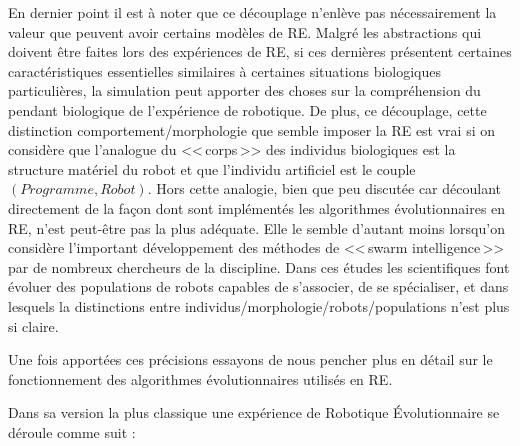 En dernier point il est à noter que ce découplage n'enlève pas nécessairement la valeur que peuvent avoir certains modèles de RE. Malgré les abstractions qui doivent être faites lors des expériences de RE, si ces dernières présentent certaines caractéristiques essentielles similaires à certaines situations biologiques particulières, la simulation peut apporter des choses sur la compréhension du pendant biologique de l'expérience de robotique. De plus, ce découplage, cette distinction comportement/morphologie que semble imposer la RE est vrai si on considère que l'analogue du <<\,corps\,>> des individus biologiques est la structure matériel du robot et que l'individu artificiel est le couple $(Programme,Robot)$. Hors cette analogie, bien que peu discutée car découlant directement de la façon dont sont implémentés les algorithmes évolutionnaires en RE, n'est peut-être pas la plus adéquate. Elle le semble d'autant moins lorsqu'on considère l'important développement des méthodes de <<\,swarm intelligence\,>> par de nombreux chercheurs de la discipline. Dans ces études les scientifiques font évoluer des populations de robots capables de s'associer, de se spécialiser, et dans lesquels la distinctions entre individus/morphologie/robots/populations n'est plus si claire.

Une fois apportées ces précisions essayons de nous pencher plus en détail sur le fonctionnement des algorithmes évolutionnaires utilisés en RE.

Dans sa version la plus classique une expérience de Robotique \'Evolutionnaire se déroule comme suit \citep[pour certains exemples historiques de la littératures]{nolfi96learning,floreano94automaticcreationofanautonomousagen,jakobi97evolutionaryroboticsandtheradicalenvelopeofnoisehypothesis}:

